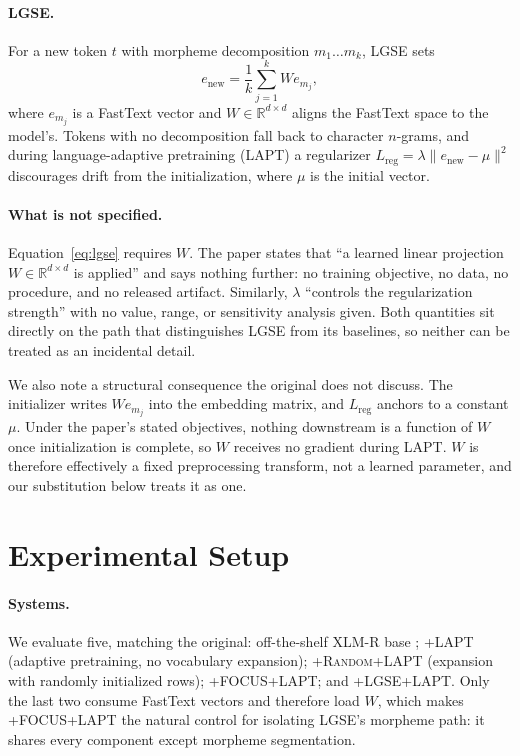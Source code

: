 \documentclass[11pt]{article}
\begin{document}
\paragraph{LGSE.} For a new token $t$ with morpheme decomposition
$m_1 \dots m_k$, LGSE sets
\begin{equation}
e_{\text{new}} = \frac{1}{k}\sum_{j=1}^{k} W e_{m_j},
\label{eq:lgse}
\end{equation}
where $e_{m_j}$ is a FastText vector and $W \in \mathbb{R}^{d \times d}$
aligns the FastText space to the model's. Tokens with no decomposition fall
back to character $n$-grams, and during language-adaptive pretraining (LAPT)
a regularizer $L_{\text{reg}} = \lambda \lVert e_{\text{new}} - \mu \rVert^2$
discourages drift from the initialization, where $\mu$ is the initial vector.

\paragraph{What is not specified.} Equation~\ref{eq:lgse} requires $W$. The
paper states that ``a learned linear projection $W \in \mathbb{R}^{d\times d}$
is applied'' and says nothing further: no training objective, no data, no
procedure, and no released artifact. Similarly, $\lambda$ ``controls the
regularization strength'' with no value, range, or sensitivity analysis
given. Both quantities sit directly on the path that distinguishes LGSE from
its baselines, so neither can be treated as an incidental detail.

We also note a structural consequence the original does not discuss. The
initializer writes $We_{m_j}$ into the embedding matrix, and $L_{\text{reg}}$
anchors to a constant $\mu$. Under the paper's stated objectives, nothing
downstream is a function of $W$ once initialization is complete, so $W$
receives no gradient during LAPT. $W$ is therefore effectively a fixed
preprocessing transform, not a learned parameter, and our substitution below
treats it as one.

\section{Experimental Setup}
\label{sec:setup}

\paragraph{Systems.} We evaluate five, matching the original: off-the-shelf
XLM-R base \citep{conneau-etal-2020-unsupervised}; \textsc{+LAPT} (adaptive
pretraining, no vocabulary expansion); \textsc{+Random+LAPT} (expansion with
randomly initialized rows); \textsc{+FOCUS+LAPT}; and \textsc{+LGSE+LAPT}.
Only the last two consume FastText vectors and therefore load $W$, which
makes \textsc{+FOCUS+LAPT} the natural control for isolating LGSE's
morpheme path: it shares every component except morpheme segmentation.
\end{document}
